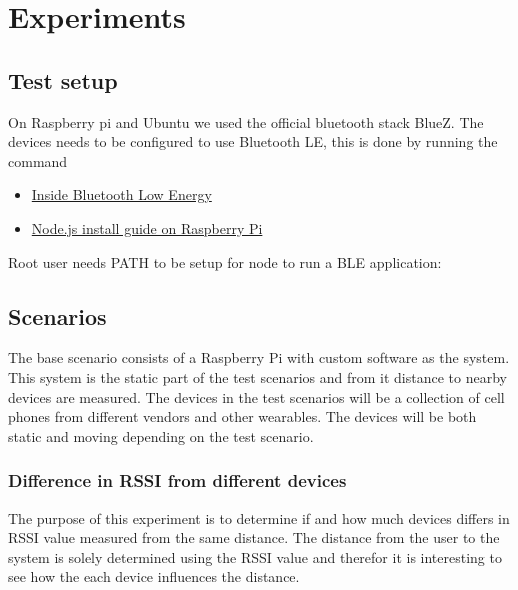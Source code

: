 \section{Experiments}

\subsection{Test setup}

On Raspberry pi and Ubuntu we used the official bluetooth stack BlueZ.
The devices needs to be configured to use Bluetooth LE, this is done by running the command 

\begin{itemize}
\item \href{http://books.google.dk/books?id=-LMq0NhoEQgC&pg=PA358&lpg=PA358&dq=EnableGatt&source=bl&ots=AXu2znOEUw&sig=PjvPAADd4H3WInDAEFszw1MALr8&hl=da&sa=X&ei=uilyU6biJIz6yAOH914CQCg&ved=0CIsBEOgBMAk#v=onepage&q=EnableGatt&f=false}
{Inside Bluetooth Low Energy}

\item \href{http://joshondesign.com/2013/10/23/noderpi}
{Node.js install guide on Raspberry Pi}

\end{itemize}

\noindent Root user needs PATH to be setup for node to run a BLE application:


\subsection{Scenarios}

The base scenario consists of a Raspberry Pi with custom software as the system.
This system is the static part of the test scenarios and from it distance to nearby devices are measured.
The devices in the test scenarios will be a collection of cell phones from different vendors and other wearables.
The devices will be both static and moving depending on the test scenario.


\subsubsection{Difference in RSSI from different devices}
The purpose of this experiment is to determine if and how much devices differs in RSSI value measured from the same distance. The distance from the user to the system is solely determined using the RSSI value and therefor it is interesting to see how the each device influences the distance.
	
